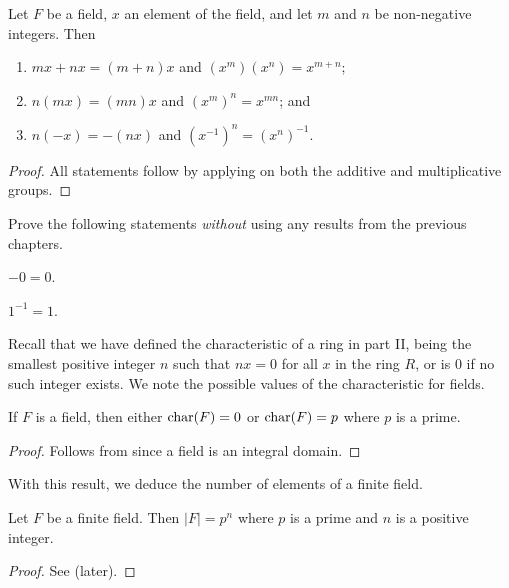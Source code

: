 \newpage

\begin{proposition}
    Let $F$ be a field, $x$ an element of the field, and let $m$ and $n$ be non-negative integers. Then
    \begin{enumerate}
        \item $mx + nx = (m+n)x$ and $(x^m)(x^n) = x^{m+n}$;
        \item $n(mx) = (mn)x$ and $(x^m)^n = x^{mn}$; and
        \item $n(-x) = -(nx)$ and $(x^{-1})^n = (x^n)^{-1}$.
    \end{enumerate}
\end{proposition}
\begin{proof}
    All statements follow by applying  on both the additive and multiplicative groups.
\end{proof}

\begin{exercise}\label{exercise-inverse-of-additive-and-multiplicative-identities-are-themselves}
    Prove the following statements \textit{without} using any results from the previous chapters.
    \begin{partquestions}{\alph*}
        \item $-0 = 0$.
        \item $1^{-1} = 1$.
    \end{partquestions}
\end{exercise}

Recall that we have defined the characteristic of a ring in part II, being the smallest positive integer $n$ such that $nx = 0$ for all $x$ in the ring $R$, or is 0 if no such integer exists. We note the possible values of the characteristic for fields.

\begin{proposition}
    If $F$ is a field, then either $\mathrm{char}(F) = 0$ or $\mathrm{char}(F) = p$ where $p$ is a prime.
\end{proposition}
\begin{proof}
    Follows from  since a field is an integral domain.
\end{proof}

With this result, we deduce the number of elements of a finite field.
\begin{theorem}\label{thrm-finite-field-has-prime-power-order}
    Let $F$ be a finite field. Then $|F| = p^n$ where $p$ is a prime and $n$ is a positive integer.
\end{theorem}
\begin{proof}
    See  (later).
\end{proof}

